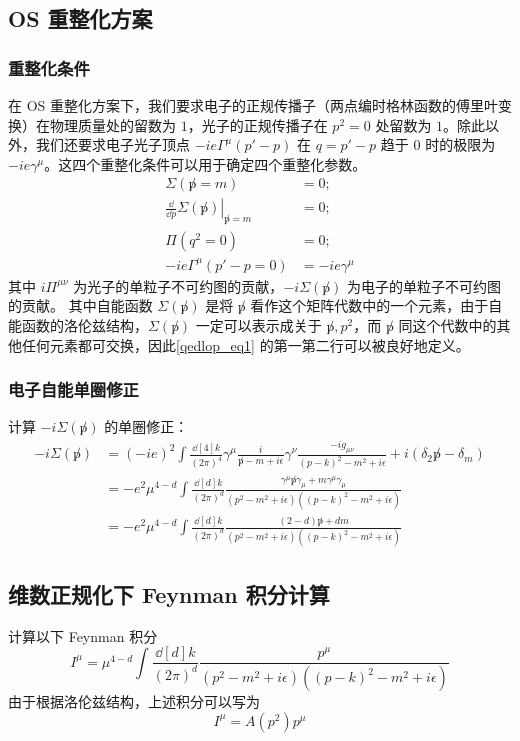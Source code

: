 \subsection{OS 重整化方案}
\subsubsection{重整化条件}
在 OS 重整化方案下，我们要求电子的正规传播子（两点编时格林函数的傅里叶变换）在物理质量处的留数为 $1$，光子的正规传播子在 $p^2=0$ 处留数为 $1$。除此以外，我们还要求电子光子顶点 $-ie\Gamma^\mu(p'-p)$ 在 $q=p'-p$ 趋于 $0$ 时的极限为 $-ie\gamma^\mu$。这四个重整化条件可以用于确定四个重整化参数。
\begin{equation}\label{qedlop_eq1}
\begin{aligned}
\Sigma(\not p=m) &= 0;\\
\left.\frac{\dd }{\dd p}\Sigma(\not p)\right|_{\not p=m}&=0;\\
\Pi(q^2=0)&=0;\\
-ie\Gamma^\mu(p'-p=0)&=-ie\gamma^\mu
\end{aligned}
\end{equation}
其中 $i\Pi^{\mu\nu}$ 为光子的单粒子不可约图的贡献，$-i\Sigma(\not p)$ 为电子的单粒子不可约图的贡献。
其中自能函数 $\Sigma(\not p)$ 是将 $\not p$ 看作这个矩阵代数中的一个元素，由于自能函数的洛伦兹结构，$\Sigma(\not p)$ 一定可以表示成关于 $\not p, p^2$，而 $\not p$ 同这个代数中的其他任何元素都可交换，因此\autoref{qedlop_eq1} 的第一第二行可以被良好地定义。
\subsubsection{电子自能单圈修正}
计算 $-i\Sigma(\not p)$ 的单圈修正：
\begin{equation}
\begin{aligned}
-i\Sigma(\not p)
&=(-ie)^2 \int\frac{\dd[4]{k}}{(2\pi)^4} \gamma^\mu\frac{i}{\not p-m+i\epsilon} \gamma^\nu  \frac{-ig_{\mu\nu}}{(p-k)^2-m^2+i\epsilon}+i(\delta_2\not p -\delta_m)\\
&=-e^2\mu^{4-d} \int\frac{\dd[d]{k}}{(2\pi)^d} \frac{\gamma^\mu \not p \gamma_\mu + m\gamma^\mu\gamma_\mu}{(p^2-m^2+i\epsilon)((p-k)^2-m^2+i\epsilon)}\\
&=-e^2\mu^{4-d} \int\frac{\dd[d]{k}}{(2\pi)^d} \frac{(2-d)\not p + dm}{(p^2-m^2+i\epsilon)((p-k)^2-m^2+i\epsilon)}
\end{aligned}
\end{equation}
\subsection{维数正规化下 Feynman 积分计算}
\begin{exercise}{}
计算以下 Feynman 积分
\begin{equation}
I^\mu = \mu^{4-d}\int\frac{\dd[d]{k}}{(2\pi)^d} \frac{p^\mu}{(p^2-m^2+i\epsilon)((p-k)^2-m^2+i\epsilon)}
\end{equation}
由于根据洛伦兹结构，上述积分可以写为
\begin{equation}
I^\mu = A(p^2) p^\mu
\end{equation}


\end{exercise}